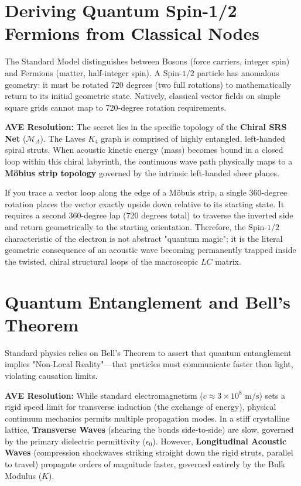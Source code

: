 \section{Deriving Quantum Spin-1/2 Fermions from Classical Nodes}
The Standard Model distinguishes between Bosons (force carriers, integer spin) and Fermions (matter, half-integer spin). A Spin-$1/2$ particle has anomalous geometry: it must be rotated 720 degrees (two full rotations) to mathematically return to its initial geometric state. Natively, classical vector fields on simple square grids cannot map to 720-degree rotation requirements. 

\textbf{AVE Resolution:} The secret lies in the specific topology of the \textbf{Chiral SRS Net} ($\mathcal{M}_A$). The Laves $K_4$ graph is comprised of highly entangled, left-handed spiral struts. When acoustic kinetic energy (mass) becomes bound in a closed loop within this chiral labyrinth, the continuous wave path physically maps to a \textbf{Möbius strip topology} governed by the intrinsic left-handed sheer planes. 

If you trace a vector loop along the edge of a Möbuis strip, a single 360-degree rotation places the vector exactly upside down relative to its starting state. It requires a second 360-degree lap (720 degrees total) to traverse the inverted side and return geometrically to the starting orientation. Therefore, the Spin-$1/2$ characteristic of the electron is not abstract "quantum magic"; it is the literal geometric consequence of an acoustic wave becoming permanently trapped inside the twisted, chiral structural loops of the macroscopic $LC$ matrix.

\section{Quantum Entanglement and Bell's Theorem}
Standard physics relies on Bell's Theorem to assert that quantum entanglement implies "Non-Local Reality"—that particles must communicate faster than light, violating causation limits. 

\textbf{AVE Resolution:} While standard electromagnetism ($c \approx 3 \times 10^8 \text{ m/s}$) sets a rigid speed limit for transverse induction (the exchange of energy), physical continuum mechanics permits multiple propagation modes. In a stiff crystalline lattice, \textbf{Transverse Waves} (shearing the bonds side-to-side) are slow, governed by the primary dielectric permittivity ($\epsilon_0$). However, \textbf{Longitudinal Acoustic Waves} (compression shockwaves striking straight down the rigid struts, parallel to travel) propagate orders of magnitude faster, governed entirely by the Bulk Modulus ($K$). 

